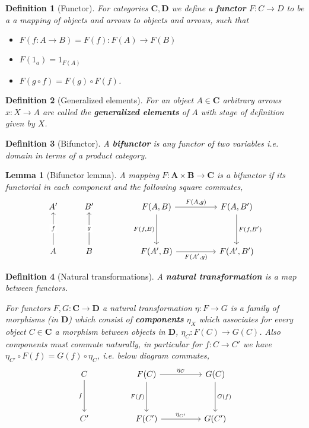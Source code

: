 \documentclass[12pt]{article}
\numberwithin{equation}{section}
\newtheorem{definition}{Definition}[section]
\newtheorem{lemma}[theorem]{Lemma}
\begin{document}
	\begin{definition}[Functor]
			For categories $\mathbf{C}, \mathbf{D}$ we define a \textbf{functor} $ F: C \to D $ to be a a mapping of objects and arrows to objects and arrows, such that
		\begin{itemize}
			\item $ F(f:A\to B) =F(f):F(A)\to F(B)$
			\item $ F(1_a)=1_{F(A)} $
			\item $ F(g \circ f) = F(g)\circ F(f)$.
		\end{itemize}
	\end{definition}

	\begin{definition}[Generalized elements]
		For an object $ A \in \mathbf{C} $ arbitrary arrows $ x:X\to A $ are called the \textbf{generalized elements} of $ A $ with stage of definition given by $ X $.
	\end{definition}
		
		\begin{definition}[Bifunctor]
			A \textbf{bifunctor} is any functor of two variables i.e. domain in terms of a product category.
		\end{definition}
		
		
		\begin{lemma}[Bifunctor lemma]\label{bifunctorlemma}
		A mapping $F: \mathbf{A} \times \mathbf{B} \to \mathbf{C}$ is a bifunctor if its functorial in each component and the following square commutes,
		\[\begin{tikzcd}
			{A'} & {B'} && {F(A,B)} && {F(A,B')} \\
			\\
			A & B && {F(A',B)} && {F(A',B')}
			\arrow["{F(A,g)}", from=1-4, to=1-6]
			\arrow["{F(A',g)}"', from=3-4, to=3-6]
			\arrow["{F(f,B')}", from=1-6, to=3-6]
			\arrow["{F(f,B)}"', from=1-4, to=3-4]
			\arrow["g"{description}, from=3-2, to=1-2]
			\arrow["f"{description}, from=3-1, to=1-1]
		\end{tikzcd}\]
		\end{lemma}
		
		\begin{definition}[Natural transformations]
			A \textbf{natural transformation} is a map between functors.
			
			For functors $F,G: \mathbf{C} \to \mathbf{D}$ a natural transformation $\eta: F \to G$ is a family of morphisms (in $\mathbf{D}$) which consist of \textbf{components} $\eta_X	$ which associates for every object $C \in \mathbf{C} $ a morphism between objects in $\mathbf{D}$, $\eta_C:F(C)\to G(C)$. Also components must commute naturally, in particular for $f: C \to C' $ we have $\eta_{C'} \circ F(f)=G(f)\circ\eta_C$, i.e. below diagram commutes,
			\[\begin{tikzcd}
				C && {F(C)} && {G(C)} \\
				\\
				{C'} && {F(C')} && {G(C')}
				\arrow["{\eta_C}", from=1-3, to=1-5]
				\arrow["{\eta_{C'}}", from=3-3, to=3-5]
				\arrow["{F(f)}"', from=1-3, to=3-3]
				\arrow["{G(f)}", from=1-5, to=3-5]
				\arrow["f"', from=1-1, to=3-1]
			\end{tikzcd}\]
		\end{definition}
		
\end{document}
